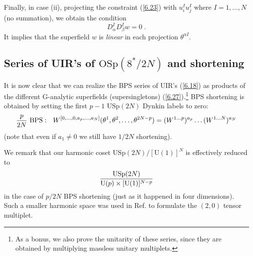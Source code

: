 \documentclass[a4paper,12pt]{article}
\begin{document}
Finally, in case (ii), projecting the constraint (\ref{6.23}) with 
$u^I_iu^I_j$ where $I=1,\ldots,N$ (no summation), we obtain the 
condition 
\begin{equation}\label{6.30'}
  D^I_\alpha D^I_\beta w=0\;.
\end{equation}
It implies that the superfield $w$ is {\sl linear} in each 
projection $\theta^{\alpha I}$. 
 

\subsection{Series of UIR's of $\mbox{OSp}(8^*/2N)$ and shortening}
\label{short6} 

It is now clear that we can realize the BPS series of UIR's 
(\ref{6.18}) as products of the different G-analytic superfields 
(supersingletons) (\ref{6.27}).\footnote{As a bonus, we also 
prove the unitarity of these series, since they are obtained by 
multiplying massless unitary multiplets.} BPS shortening is 
obtained by setting the first $p-1$ $\mbox{USp}(2N)$ Dynkin 
labels to zero: 
\begin{equation}\label{6.34}
{p\over 2N}\ \mbox{BPS}:\ \ W^{[0,\ldots,0,a_p,\ldots,a_N]} 
(\theta^1,\theta^2,\ldots,\theta^{2N-p}) =  (W^{1\ldots 
p})^{a_p}\ldots (W^{1\ldots N})^{a_N}  
\end{equation}
(note that even if $a_1\neq 0$ we still have $1/2N$ shortening).

 

We remark that our harmonic coset $\mbox{USp}(2N)/[\mbox{U}(1)]^N$ 
is effectively reduced to
\begin{equation}\label{6.35}
  {\mbox{USp}(2N)\over \mbox{U}(p)\times [\mbox{U}(1)]^{N-p}}
\end{equation}
in the case of $p/2N$ BPS shortening (just as it happened in four 
dimensions).  Such a smaller harmonic space was used in  Ref. 
\cite{Howe} to formulate the $(2,0)$ tensor multiplet. 
\end{document}
